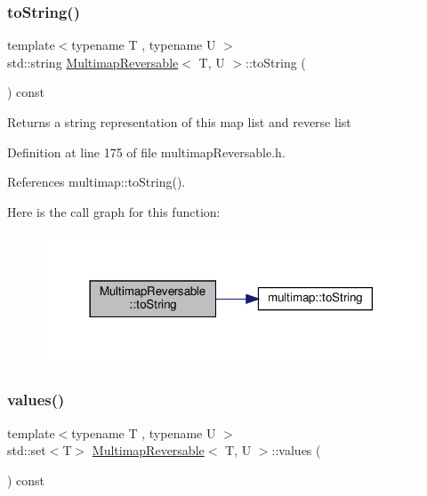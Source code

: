 \subsubsection{\texorpdfstring{to\+String()}{toString()}}
{\footnotesize\ttfamily template$<$typename T , typename U $>$ \\
std\+::string \hyperlink{classMultimapReversable}{Multimap\+Reversable}$<$ T, U $>$\+::to\+String (\begin{DoxyParamCaption}{ }\end{DoxyParamCaption}) const\hspace{0.3cm}{\ttfamily [inline]}}

\begin{DoxyReturn}{Returns}
a string representation of this map list and reverse list 
\end{DoxyReturn}


Definition at line 175 of file multimap\+Reversable.\+h.



References multimap\+::to\+String().

Here is the call graph for this function\+:
\nopagebreak
\begin{figure}[H]
\begin{center}
\leavevmode
\includegraphics[width=318pt]{classMultimapReversable_afaf809098df54c5619f06a71507214a4_cgraph}
\end{center}
\end{figure}
\mbox{\label{classMultimapReversable_a85a6dee36cb566aa874e9d18b5328757}} 
\subsubsection{\texorpdfstring{values()}{values()}}
{\footnotesize\ttfamily template$<$typename T , typename U $>$ \\
std\+::set$<$T$>$ \hyperlink{classMultimapReversable}{Multimap\+Reversable}$<$ T, U $>$\+::values (\begin{DoxyParamCaption}{ }\end{DoxyParamCaption}) const\hspace{0.3cm}{\ttfamily [inline]}}

